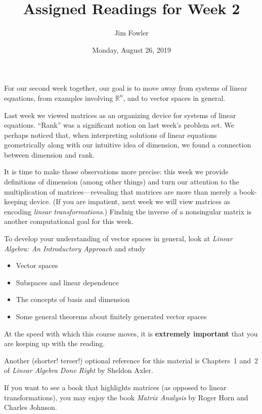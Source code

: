 \documentclass{homework}
\author{Jim Fowler}
\title{Assigned Readings for Week 2}
\date{Monday, August 26, 2019}
\begin{document}
\maketitle

For our second week together, our goal is to move away from systems of
linear equations, from examples involving $\mathbb{R}^n$, and to vector
spaces in general.

Last week we viewed matrices as an organizing device for systems of
linear equations.  ``Rank'' was a significant notion on last week's
problem set.  We perhaps noticed that, when interpreting solutions of
linear equations geometrically along with our intuitive idea of
dimension, we found a connection between dimension and rank.

It is time to make those observations more precise: this week we
provide definitions of dimension (among other things) and turn our
attention to the multiplication of matrices---revealing that matrices
are more than merely a book-keeping device.  (If you are impatient,
next week we will view matrices as encoding \textit{linear
  transformations}.)  Findnig the inverse of a nonsingular matrix is
another computational goal for this week.

To develop your understanding of vector spaces in general, look at
\textit{Linear Algebra: An Introductory Approach} and study
\begin{itemize}
\item {} Vector spaces
\item {} Subspaces and linear dependence
\item {} The concepts of basis and dimension
\item {} Some general theorems about finitely generated vector spaces
\end{itemize}
At the speed with which this course moves, it is \textbf{extremely
  important} that you are keeping up with the reading.

Another (shorter!  terser!) optional reference for this material is
Chapters~1 and~2 of \textit{Linear Algebra Done Right} by Sheldon
Axler.

If you want to see a book that highlights matrices (as opposed to
linear transformations), you may enjoy the book \textit{Matrix
  Analysis} by Roger Horn and Charles Johnson.
\end{document}
